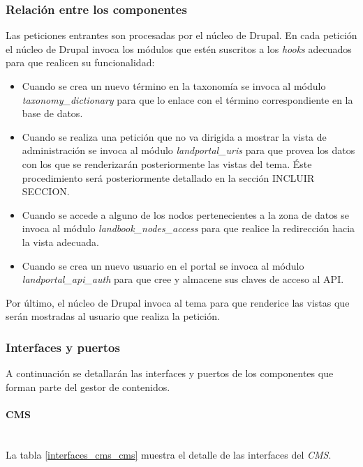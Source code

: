 \subsubsection{Relación entre los componentes}
Las peticiones entrantes son procesadas por el núcleo de Drupal.  En cada petición el núcleo de Drupal invoca los módulos que estén suscritos a los \textit{hooks} adecuados para que realicen su funcionalidad:
\begin{itemize}
	\item Cuando se crea un nuevo término en la taxonomía se invoca al módulo \textit{taxonomy\_dictionary} para que lo enlace con el término correspondiente en la base de datos.
	\item Cuando se realiza una petición que no va dirigida a mostrar la vista de administración se invoca al módulo \textit{landportal\_uris} para que provea los datos con los que se renderizarán posteriormente las vistas del tema.  Éste procedimiento será posteriormente detallado en la sección INCLUIR SECCION.
	\item Cuando se accede a alguno de los nodos pertenecientes a la zona de datos se invoca al módulo \textit{landbook\_nodes\_access} para que realice la redirección hacia la vista adecuada.
	\item Cuando se crea un nuevo usuario en el portal se invoca al módulo \textit{landportal\_api\_auth} para que cree y almacene sus claves de acceso al API.
\end{itemize}
Por último, el núcleo de Drupal invoca al tema para que renderice las vistas que serán mostradas al usuario que realiza la petición.


\subsubsection{Interfaces y puertos}
A continuación se detallarán las interfaces y puertos de los componentes que forman parte del gestor de contenidos. 

\paragraph{CMS} \hfill \\
La tabla \ref{interfaces_cms_cms} muestra el detalle de las interfaces del \textit{CMS}.


